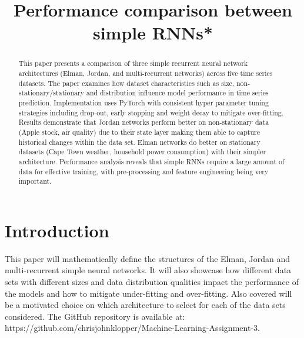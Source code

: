 \documentclass[conference]{IEEEtran}
\begin{document}
	


\title{Performance comparison between simple RNNs*\\
{\footnotesize}
}

\author{

}

\maketitle

\begin{abstract}
This paper presents a comparison of three simple recurrent neural network architectures (Elman, Jordan, and multi-recurrent networks) across five time series datasets. The paper examines how dataset characteristics such as size, non-stationary/stationary and distribution influence model performance in time series prediction. Implementation uses PyTorch with consistent hyper parameter tuning strategies including drop-out, early stopping and weight decay to mitigate over-fitting. Results demonstrate that Jordan networks perform better on non-stationary data (Apple stock, air quality) due to their state layer making them able to capture historical changes within the data set. Elman networks do better on stationary datasets (Cape Town weather, household power consumption) with their simpler architecture. Performance analysis reveals that simple RNNs require a large amount of data for effective training, with pre-processing and feature engineering being very important.
\end{abstract}



\section{Introduction}


This paper will mathematically define the structures of the Elman, Jordan and multi-recurrent simple neural networks. It will also showcase how different data sets with different sizes and data distribution qualities impact the performance of the models and how to mitigate under-fitting and over-fitting. Also covered will be a motivated choice on which architecture to select for each of the data sets considered. The GitHub repository is available at: https://github.com/chrisjohnklopper/Machine-Learning-Assignment-3.
\end{document}
